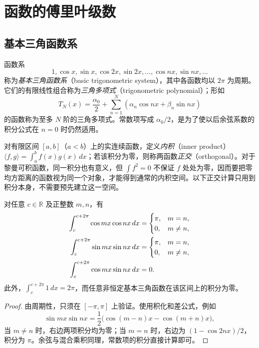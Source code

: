 \documentclass[UTF8,12pt,a4paper,fontset=fandol]{ctexbook}
\begin{document}
\section{函数的傅里叶级数}
\label{sec:fourier-series-of-functions}

\subsection{基本三角函数系}
\label{subsec:basic-trigonometric-system}

函数系
\[
    1,\cos x,\sin x,\cos2x,\sin2x,\ldots,\cos nx,\sin nx,\ldots
\]
称为\emph{基本三角函数系}（basic trigonometric system），其中各函数均以 $2\pi$ 为周期。它们的有限线性组合称为\emph{三角多项式}（trigonometric polynomial）；形如
\[
    T_N(x)=\frac{\alpha_0}{2}
      +\sum_{n=1}^N(\alpha_n\cos nx+\beta_n\sin nx)
\]
的函数称为至多 $N$ 阶的三角多项式。常数项写成 $\alpha_0/2$，是为了使以后余弦系数的积分公式在 $n=0$ 时仍然适用。

对有限区间 $[a,b]$（$a<b$）上的实连续函数，定义\emph{内积}（inner product）$\langle f,g\rangle=\int_a^bf(x)g(x)\,dx$；若该积分为零，则称两函数\emph{正交}（orthogonal）。对于黎曼可积函数，同一积分也有意义，但 $\int f^2=0$ 不保证 $f$ 处处为零，因而要把零均方距离的函数视为同一个对象，才能得到通常的内积空间。以下正交计算只用到积分本身，不需要预先建立这一空间。

\begin{proposition}[基本三角函数系的正交关系]
\label{prop:trigonometric-orthogonality}
对任意 $c\in\mathbb R$ 及正整数 $m,n$，有
\begin{align}
    \int_c^{c+2\pi}\cos mx\cos nx\,dx
       &=\begin{cases}\pi,&m=n,\\0,&m\neq n,\end{cases}\notag\\
    \int_c^{c+2\pi}\sin mx\sin nx\,dx
       &=\begin{cases}\pi,&m=n,\\0,&m\neq n,\end{cases}\notag\\
    \int_c^{c+2\pi}\cos mx\sin nx\,dx&=0.
    \label{eq:trigonometric-orthogonality}
\end{align}
此外，$\int_c^{c+2\pi}1\,dx=2\pi$，而任意非恒定基本三角函数在该区间上的积分为零。
\end{proposition}

\begin{proof}
由周期性，只须在 $[-\pi,\pi]$ 上验证。使用积化和差公式，例如
\[
    \sin mx\sin nx
      =\frac12\bigl(\cos(m-n)x-\cos(m+n)x\bigr),
\]
当 $m\neq n$ 时，右边两项积分均为零；当 $m=n$ 时，右边为 $(1-\cos2nx)/2$，积分为 $\pi$。余弦与混合乘积同理，常数项的积分直接计算即可。
\end{proof}
\end{document}
